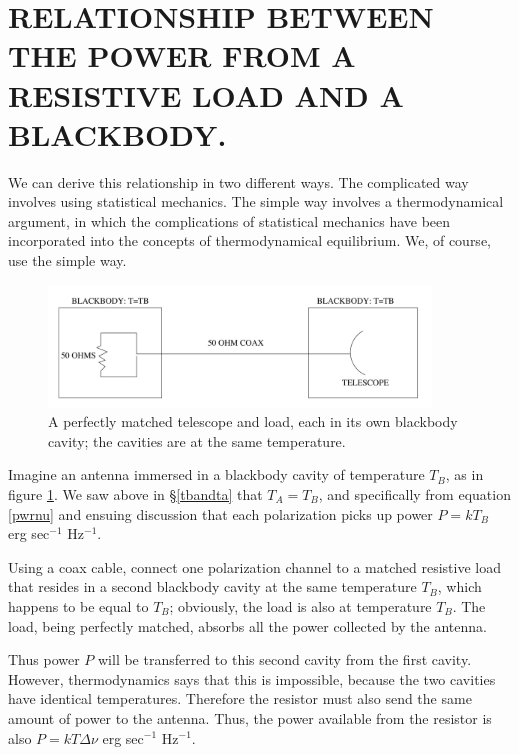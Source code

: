 \documentclass[12pt,psfig,preprint]{aastex}
\begin{document}
\section {RELATIONSHIP BETWEEN THE POWER FROM A RESISTIVE
LOAD AND A BLACKBODY.} 

\label{4p3}

	We can derive this relationship in two different ways.  The
complicated way involves using statistical mechanics.  The simple way
involves a thermodynamical argument, in which the complications of
statistical mechanics have been incorporated into the concepts of
thermodynamical equilibrium.  We, of course, use the simple way. 


\begin{figure}[h!]
\begin{center}
\includegraphics[width=4in]{fount_fig2.png}
\end{center}
\vspace{-1ex}
\caption{\footnotesize A perfectly matched telescope and load, each in
  its own blackbody cavity; the cavities are at the same
  temperature.\label{fount2}}
\end{figure}

	Imagine an antenna immersed in a blackbody cavity of temperature
$T_B$, as in figure \ref{fount2}.   We saw above in \S \ref{tbandta}
that $T_A = T_B$, and specifically from equation \ref{pwrnu} and ensuing
discussion that each polarization picks up power $P = kT_B$ erg
sec$^{-1}$ Hz$^{-1}$.

          Using a coax cable, connect one polarization channel to a
matched resistive load that resides in a second blackbody cavity at the
same temperature $T_B$, which happens to be equal to $T_B$; obviously, the load
is also at temperature $T_B$.  The load, being perfectly matched, absorbs
all the power collected by the antenna.  

	Thus power $P$ will be transferred to this second cavity
from the first cavity.  However, thermodynamics says that this is
impossible, because the two cavities have identical temperatures. 
Therefore the resistor must also send the same amount of power to the
antenna.  Thus, the power available from the resistor is also $P =
k T \Delta \nu$ erg sec$^{-1}$ Hz$^{-1}$. 
\end{document}
